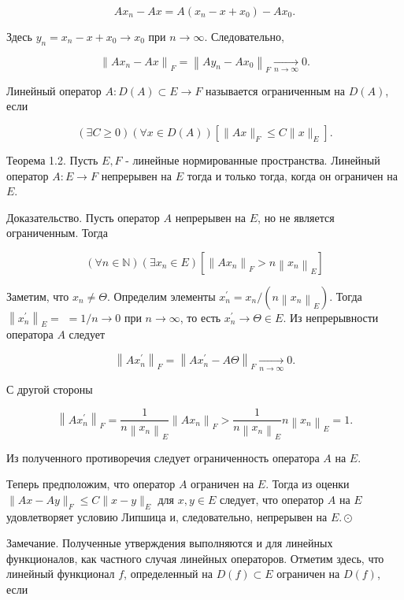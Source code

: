 $$
	A x_{n}-A x=A\left(x_{n}-x+x_{0}\right)-A x_{0} .
$$

Здесь $y_{n}=x_{n}-x+x_{0} \rightarrow x_{0}$ при $n \rightarrow \infty$. Следовательно,

$$
	\left\|A x_{n}-A x\right\|_{F}=\left\|A y_{n}-A x_{0}\right\|_{F} \underset{n \rightarrow \infty}{\longrightarrow} 0 .
$$

Линейный оператор $A: D(A) \subset E \rightarrow F$ называется \hypertarget{ogranichenn}{ограниченным} на $D(A)$, если

$$
	(\exists C \geq 0)(\forall x \in D(A))\left[\|A x\|_{F} \leq C\|x\|_{E}\right] .
$$

Теорема 1.2. Пусть $E, F$ - линейные нормированные пространства. Линейный оператор $A: E \rightarrow F$ непрерывен на $E$ тогда и только тогда, когда он ограничен на $E$.

Доказательство. Пусть оператор $A$ непрерывен на $E$, но не является ограниченным. Тогда

$$
	(\forall n \in \mathbb{N})\left(\exists x_{n} \in E\right)\left[\left\|A x_{n}\right\|_{F}>n\left\|x_{n}\right\|_{E}\right]
$$

Заметим, что $x_{n} \neq \Theta$. Определим элементы $x_{n}^{\prime}=x_{n} /\left(n\left\|x_{n}\right\|_{E}\right)$. Тогда $\left\|x_{n}^{\prime}\right\|_{E}=$ $=1 / n \rightarrow 0$ при $n \rightarrow \infty$, то есть $x_{n}^{\prime} \rightarrow \Theta \in E$. Из непрерывности оператора $A$ следует

$$
	\left\|A x_{n}^{\prime}\right\|_{F}=\left\|A x_{n}^{\prime}-A \Theta\right\|_{F} \underset{n \rightarrow \infty}{\longrightarrow} 0 .
$$

С другой стороны

$$
	\left\|A x_{n}^{\prime}\right\|_{F}=\frac{1}{n\left\|x_{n}\right\|_{E}}\left\|A x_{n}\right\|_{F}>\frac{1}{n\left\|x_{n}\right\|_{E}} n\left\|x_{n}\right\|_{E}=1 .
$$

Из полученного противоречия следует ограниченность оператора $A$ на $E$.

Теперь предположим, что оператор $A$ ограничен на $E$. Тогда из оценки $\|A x-A y\|_{F} \leq C\|x-y\|_{E}$ для $x, y \in E$ следует, что оператор $A$ на $E$ удовлетворяет условию Липшица и, следовательно, непрерывен на $E . \odot$

Замечание. Полученные утверждения выполняются и для линейных функционалов, как частного случая линейных операторов. Отметим здесь, что линейный функционал $f$, определенный на $D(f) \subset E$ ограничен на $D(f)$, если


